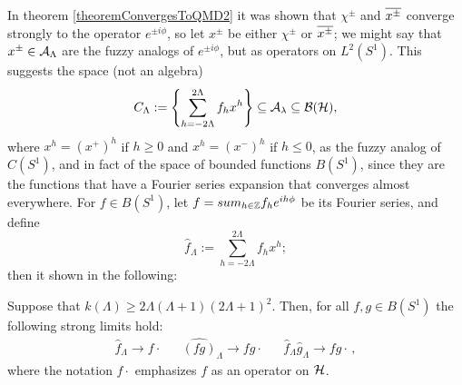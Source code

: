 In theorem \ref{theoremConvergesToQMD2} it was shown that $\chi^\pm$ and $\overline{x^\pm}$ converge strongly to the operator $e^{\pm i\phi}$, so let $x^\pm$ be either $\chi^\pm$ or $\overline{x^\pm}$; we might say that $x^\pm \in \mathcal A_\Lambda$ are the fuzzy analogs of $e^{\pm i\phi}$, but as operators on $L^2(S^1)$. This suggests \cite{Fiore2018} the space (not an algebra)
\begin{equation}
    C_\Lambda := \left\{ \sum_{h = -2\Lambda}^{2\Lambda} f_h x^h \right\} \subseteq \mathcal A_\lambda \subseteq \mathcal B(\mathcal H),
\end{equation}
where $x^h = (x^+)^h$ if $h \geq 0$ and $x^h = (x^-)^h$ if $h \leq 0$, as the fuzzy analog of $C(S^1)$, and in fact of the space of bounded functions $B(S^1)$, since they are the functions that have a Fourier series expansion that converges almost everywhere. For $f \in B(S^1)$, let $f = sum_{h \in \ZZ} f_h e^{ih\phi}$ be its Fourier series, and define
\begin{equation}
    \hat f_\Lambda := \sum_{h = -2\Lambda}^{2\Lambda} f_h x^h;
\end{equation}
then it shown in \cite{Fiore2018} the following:

\begin{theorem}
Suppose that $k(\Lambda) \geq 2\Lambda(\Lambda+1)(2\Lambda+1)^2$. Then, for all $f, g \in B(S^1)$ the following strong limits hold:
\begin{align}
    \hat f_\Lambda \to f\cdot && \hat{(fg)}_\Lambda \to fg\cdot && \hat f_\Lambda \hat g_\Lambda \to fg \cdot\,,
\end{align}
where the notation $f\cdot$ emphasizes $f$ as an operator on $\mathcal H$.
\end{theorem}



    
    
